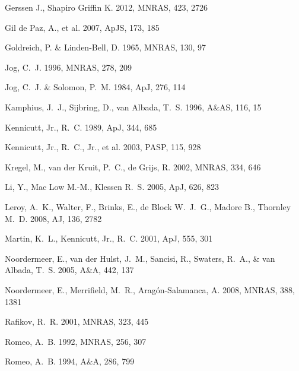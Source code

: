 \documentclass[russian,12pt]{article}
\begin{document}
\begin{thebibliography}{99}
    {Gerssen} J., {Shapiro Griffin} K. 2012, MNRAS, 423, 2726

    {Gil de Paz}, A., et al. 2007, ApJS, 173, 185

    {Goldreich}, P. \& {Linden-Bell}, D. 1965, MNRAS, 130, 97

    {Jog}, C.~J. 1996, MNRAS, 278, 209

    {Jog}, C.~J. \& {Solomon}, P.~M. 1984, ApJ, 276, 114

   {Kamphius}, J.~J., {Sijbring}, D., {van Albada}, T.~S. 1996,
   A\&AS, 116, 15

    {Kennicutt}, Jr., R.~C. 1989, ApJ, 344, 685

    {Kennicutt}, Jr., R.~C., Jr., et al. 2003, PASP, 115, 928

    {Kregel}, M., {van der Kruit}, P.~C., {de Grijs}, R. 
    2002, MNRAS, 334, 646

    {Li}, Y., {Mac Low} M.-M., {Klessen} R.~S. 2005, ApJ, 626, 823

    {Leroy}, A.~K., {Walter}, F., {Brinks}, E., 
    {de Block} W.~J.~G., {Madore} B., {Thornley} M.~D. 
    2008, AJ, 136, 2782

    {Martin}, K.~L., {Kennicutt}, Jr., R.~C. 2001, ApJ, 555, 301

   {Noordermeer}, E., {van der Hulst}, J.~M., {Sancisi}, R., 
   {Swaters}, R.~A., \& {van Albada}, T.~S. 2005, A\&A, 442, 137

    {Noordermeer}, E., {Merrifield}, M.~R., 
    {Arag{\'o}n-Salamanca}, A. 2008, MNRAS, 388, 1381

    {Rafikov}, R.~R. 2001, MNRAS, 323, 445

    {Romeo}, A.~B. 1992, MNRAS, 256, 307

    {Romeo}, A.~B. 1994, A\&A, 286, 799


\end{thebibliography}
\end{document}
